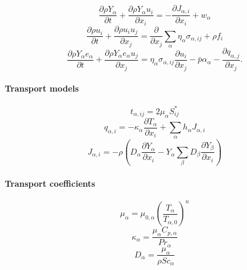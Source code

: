 \documentclass[oneside,a4paper,11pt]{report}
\begin{document}
\begin{equation*}
    \frac{\partial\rho Y_\alpha}{\partial t}+\frac{\partial \rho Y_\alpha u_i}{\partial x_i} = -\frac{\partial J_{\alpha,i}}{\partial x_i} + w_\alpha
\end{equation*}
\begin{equation*}
    \frac{\partial \rho u_i}{\partial t} + \frac{\partial \rho u_i u_j}{\partial x_j} = \frac{\partial}{\partial x_j} \sum_\alpha \eta_\alpha \sigma_{\alpha,ij} + \rho f_i
\end{equation*}
\begin{equation}
    \frac{\partial \rho Y_\alpha e_\alpha}{\partial t} + \frac{\partial \rho Y_\alpha e_\alpha u_j}{\partial x_j} = \eta_\alpha \sigma_{\alpha,ij} \frac{\partial u_i}{\partial x_j} - \bar{p} \alpha_\alpha - \frac{\partial q_{\alpha,j}}{\partial x_j}.
\end{equation}

\paragraph{Transport models}

\begin{equation*}
t_{\alpha,ij} = 2\mu_\alpha S_{ij}^*
\end{equation*}
\begin{equation*}
q_{\alpha,i} = -\kappa_\alpha \frac{\partial T_\alpha}{\partial x_i}  + \sum_\alpha h_\alpha J_{\alpha,i}
\end{equation*}
\begin{equation*}
J_{\alpha,i} = -\rho \left ( D_\alpha \frac{\partial Y_\alpha}{\partial x_i} - Y_\alpha \sum_\beta D_\beta \frac{\partial Y_\beta}{\partial x_i} \right )
\end{equation*}

\paragraph{Transport coefficients}

\begin{equation*}
\mu_\alpha = \mu_{0,\alpha} \left ( \frac{T_\alpha}{T_{\alpha,0}} \right )^n
\end{equation*}
\begin{equation*}
\kappa_\alpha = \frac{\mu_\alpha C_{p,\alpha}}{Pr_\alpha}
\end{equation*}
\begin{equation*}
D_\alpha = \frac{\mu_\alpha}{\rho Sc_\alpha}
\end{equation*}
\end{document}
